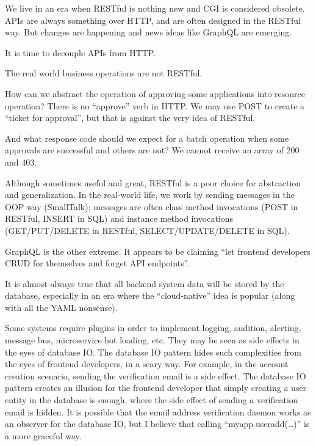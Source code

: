 
\begin{multicols*}{2}
	We live in an era when RESTful is nothing new and CGI is considered obsolete.
	APIs are always something over HTTP, and are often designed in the RESTful way.
	But changes are happening and news ideas like GraphQL are emerging.

    It is time to decouple APIs from HTTP.

	The real world business operations are not RESTful.

	How can we abstract the operation of approving some applications into resource operation?
	There is no ``approve'' verb in HTTP.
	We may use POST to create a ``ticket for approval'',
	but that is against the very idea of RESTful.

	And what response code should we expect for a batch operation when some approvals are successful and others are not?
	We cannot receive an array of 200 and 403.

	Although sometimes useful and great, RESTful is a poor choice for abstraction and generalization.
	In the real-world life, we work by sending messages in the OOP way (SmallTalk);
	messages are often class method invocations (POST in RESTful, INSERT in SQL)
	and instance method invocations (GET/PUT/DELETE in RESTful, SELECT/UPDATE/DELETE in SQL).

	GraphQL is the other extreme.
	It appears to be claiming ``let frontend developers CRUD for themselves and forget API endpoints''.

	It is almost-always true that all backend system data will be stored by the database,
	especially in an era where the ``cloud-native'' idea is popular (along with all the YAML nonsense).

	Some systems require plugins in order to implement
	logging, audition, alerting, message bus, microservice hot loading, etc.
	They may be seen as side effects in the eyes of database IO.
	The database IO pattern hides such complexities from the eyes of frontend developers, in a scary way.
	For example, in the account creation scenario, sending the verification email is a side effect.
	The database IO pattern creates an illusion for the frontend developer that
	simply creating a user entity in the database is enough,
	where the side effect of sending a verification email is hidden.
	It is possible that the email address verification daemon works as an observer for the database IO,
	but I believe that calling ``myapp.useradd(\ldots)'' is a more graceful way.


\end{multicols*}

